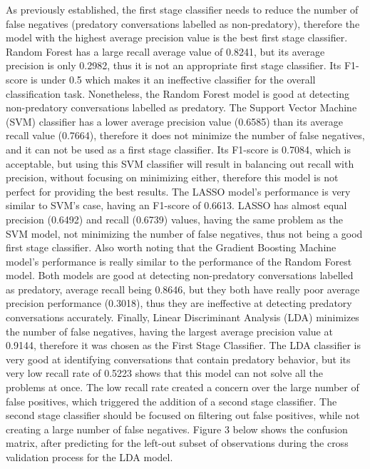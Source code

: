 \documentclass[11pt]{article}
\begin{document}
As previously established, the first stage classifier needs to reduce the number of false negatives (predatory conversations labelled as non-predatory), therefore the model with the highest average precision value is the best first stage classifier. Random Forest has a large recall average value of 0.8241, but its average precision is only 0.2982, thus it is not an appropriate first stage classifier. Its F1-score is under 0.5 which makes it an ineffective classifier for the overall classification task. Nonetheless, the Random Forest model is good at detecting non-predatory conversations labelled as predatory. The Support Vector Machine (SVM) classifier has a lower average precision value (0.6585) than its average recall value (0.7664), therefore it does not minimize the number of false negatives, and it can not be used as a first stage classifier. Its F1-score is 0.7084, which is acceptable, but using this SVM classifier will result in balancing out recall with precision, without focusing on minimizing either, therefore this model is not perfect for providing the best results. The LASSO model's performance is very similar to SVM's case, having an F1-score of 0.6613. LASSO has almost equal precision (0.6492) and recall (0.6739) values, having the same problem as the SVM model, not minimizing the number of false negatives, thus not being a good first stage classifier. Also worth noting that the Gradient Boosting Machine model's performance is really similar to the performance of the Random Forest model. Both models are good at detecting non-predatory conversations labelled as predatory, average recall being 0.8646, but they both have really poor average precision performance (0.3018), thus they are ineffective at detecting predatory conversations accurately. Finally, Linear Discriminant Analysis (LDA) minimizes the number of false negatives, having the largest average precision value at 0.9144, therefore it was chosen as the First Stage Classifier. The LDA classifier is very good at identifying conversations that contain predatory behavior, but its very low recall rate of 0.5223 shows that this model can not solve all the problems at once. The low recall rate created a concern over the large number of false positives, which triggered the addition of a second stage classifier. The second stage classifier should be focused on filtering out false positives, while not creating a large number of false negatives. Figure 3 below shows the confusion matrix, after predicting for the left-out subset of observations during the cross validation process for the LDA model.
\end{document}
